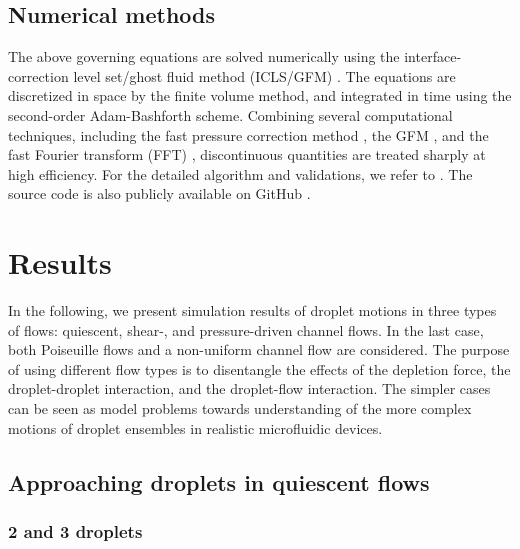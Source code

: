 \subsection{Numerical methods}

The above governing equations are solved numerically using the interface-correction level set/ghost fluid method (ICLS/GFM) \citep{ICLS}. The equations are discretized in space by the finite volume method, and integrated in time using the second-order Adam-Bashforth scheme. Combining several computational techniques, including the fast pressure correction method \citep{Dodd_JCP_2014}, the GFM \citep{Fedkiw_JCP_1999}, and the fast Fourier transform (FFT) \citep{Schumann_JCP_1988}, discontinuous quantities are treated sharply at high efficiency. For the detailed algorithm and validations, we refer to  \cite{ICLS}. The source code is also publicly available on GitHub \citep{icls_code}.

\section{Results}

In the following, we present simulation results of droplet motions in three types of flows: quiescent, shear-, and pressure-driven channel flows. In the last case, both Poiseuille flows and a non-uniform channel flow are considered. The purpose of using different flow types is to disentangle the effects of the depletion force, the droplet-droplet  interaction, and the droplet-flow interaction. The simpler cases can be seen as model problems towards understanding of the more complex motions of droplet ensembles in realistic microfluidic devices.

\subsection{Approaching droplets in quiescent flows} \label{sec:quiescent}
\subsubsection{2 and 3 droplets}

